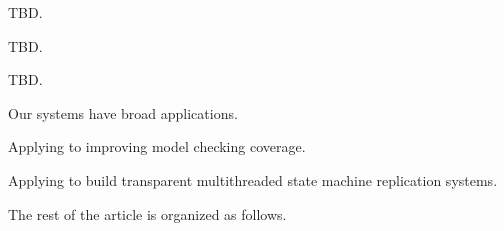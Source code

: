 






\tern TBD.

\peregrine TBD.

\parrot TBD.

Our \smt systems have broad applications.

Applying \smt to improving model checking coverage.

Applying \smt to build transparent multithreaded state machine replication systems.

The rest of the article is organized as follows.

